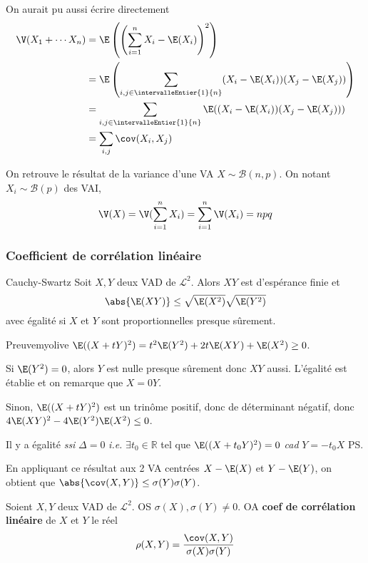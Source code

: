     On aurait pu aussi écrire directement
    \begin{align*}
        \V(X_1 + \cdots X_n) 
        &= \E\left(\left(\sum_{i = 1}^n X_i - \E(X_i)\right)^2\right) \\
        &= \E\left(\sum_{i,j \in \intervalleEntier{1}{n}} (X_i - \E(X_i))(X_j - \E(X_j))\right) \\
        &= \sum_{i,j \in \intervalleEntier{1}{n}} \E((X_i - \E(X_i))(X_j - \E(X_j))) \\
        &= \sum_{i,j} \cov(X_i, X_j)
    \end{align*} 

    On retrouve le résultat de la variance d’une VA $X \sim \mathcal{B}(n,p)$. On notant $X_i \sim \mathcal{B}(p)$ des VAI, 
    \[ \V(X) = \V(\sum_{i = 1}^n X_i) = \sum_{i =1}^n \V(X_i) = npq \]   

    \subsubsection{Coefficient de corrélation linéaire}

    \begin{prop}{Cauchy-Swartz}{}
        Soit $X,Y$ deux VAD de $\mathcal{L}^2$. Alors $XY$ est d’espérance finie et 
        \[ \abs{\E(XY)} \leq \sqrt{\E(X^2)} \sqrt{\E(Y^2)} \]   
        avec égalité si $X$ et $Y$ sont proportionnelles presque sûrement.
    \end{prop}

    \begin{demo}{Preuve}{myolive}
        $\E((X + tY)^2) = t^2 \E(Y^2) + 2t \E(XY) + \E(X^2) \geq 0$. 
        
        Si $\E(Y^2) = 0$, alors $Y$ est nulle presque sûrement donc $XY$ aussi. L’égalité est établie et on remarque que $X = 0 Y$. 
        
        Sinon, $\E((X + t Y)^2)$ est un trinôme positif, donc de déterminant négatif, donc $4 \E(XY)^2 - 4 \E(Y^2) \E(X^2) \leq 0$. 
        
        Il y a égalité \textit{ssi} $\Delta = 0$ \textit{i.e.} $\exists t_0 \in \mathbb{R}$ tel que $\E((X + t_0 Y)^2) = 0$ \textit{cad} $Y = -t_0 X$ PS.
    \end{demo}

    En appliquant ce résultat aux 2 VA centrées $X - \E(X)$ et $Y - \E(Y)$, on obtient que $\abs{\cov(X,Y)} \leq \sigma(Y) \sigma(Y)$. 

    \begin{defi}{}{}
        Soient $X,Y$ deux VAD de $\mathcal{L}^2$. OS $\sigma(X), \sigma(Y) \neq 0$. OA \textbf{coef de corrélation linéaire} de $X$ et $Y$ le réel 
        \[ \rho(X,Y) = \frac{\cov(X,Y)}{\sigma(X)\sigma(Y)} \]    
    \end{defi}

